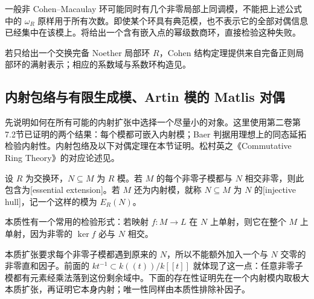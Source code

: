 \ProseParagraphBreak
一般非 Cohen–Macaulay 环可能同时有几个非零局部上同调模，不能把上述公式中的 \(\omega_R\) 原样用于所有次数。即使某个环具有典范模，也不表示它的全部对偶信息已经集中在该模上。将给出一个含有嵌入点的幂级数商环，直接检验这种失败。

\ProseParagraphBreak
若只给出一个交换完备 Noether 局部环 \(R\)，Cohen 结构定理提供来自完备正则局部环的满射表示；相应的系数域与系数环构造见。

\subsection{内射包络与有限生成模、Artin 模的 Matlis 对偶}
\label{b3:subsec:2202:04}

先说明如何在所有可能的内射扩张中选择一个尽量小的对象。这里使用第二卷第7.2节已证明的两个结果：每个模都可嵌入内射模；Baer 判据用理想上的同态延拓检验内射性。内射包络及以下对偶定理在本节证明。松村英之《Commutative Ring Theory》的对应论述见\cite[\S 18, Theorems 18.4--18.7, pp. 145--150]{Matsumura1989CommutativeRingTheory}。

\begin{definition}\label{b3:def:injective-hull}
	设 \(R\) 为交换环，\(N\subseteq M\) 为 \(R\) 模。若 \(M\) 的每个非零子模都与 \(N\) 相交非零，则此包含为[essential extension]。若 \(M\) 还为内射模，就称 \(N\subseteq M\) 为 \(N\) 的[injective hull]，记一个这样的模为 \(E_R(N)\)。
\end{definition}

本质性有一个常用的检验形式：若映射 \(f:M\rightarrow L\) 在 \(N\) 上单射，则它在整个 \(M\) 上单射，因为非零的 \(\ker f\) 必与 \(N\) 相交。

\ProseParagraphBreak
本质扩张要求每个非零子模都遇到原来的 \(N\)，所以不能额外加入一个与 \(N\) 交零的非零直和因子。前面的 \(kt^{-1}\subset k(\!(t)\!)/k[\![t]\!]\) 就体现了这一点：任意非零子模都有元素经乘法落到这份剩余域中。下面的存在性证明先在一个内射模内取极大本质扩张，再证明它本身内射；唯一性同样由本质性排除补因子。

